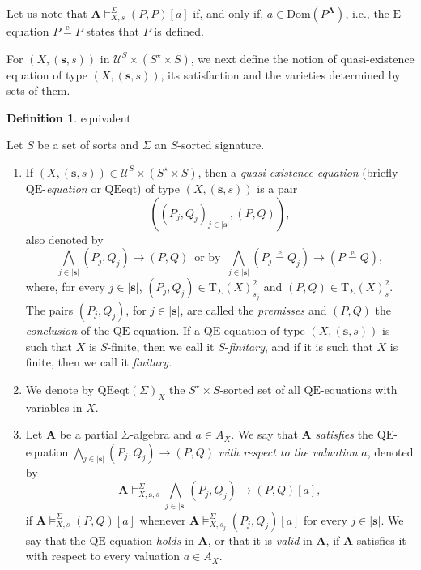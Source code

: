 \documentclass[a4paper, reqno]{amsbook}
\makeatletter
\newcommand{\bb}[1]{\ensuremath{\lvert #1 \rvert}}
\newcommand{\eeq}{\overset{\mathrm e}{=}}      %
\newcommand{\QE}{\mathrm{QE}}
\newcommand{\Dom}{\mathrm{Dom}}
\theoremstyle{plain}
\theoremstyle{definition}
\newtheorem{definition}[theorem]{Definition}
\newcommand*{\CA@leanpending}{}
\newcommand*{\CA@leanrelation}{}
\newcommand*{\lean}[2]{%
  \ifcsname\string\color@lean@#1\endcsname\else
    \PackageError{main}{Unknown relation `#1' in \string\lean}{Use equivalent, weaker or stronger.}%
  \fi
  \gdef\CA@leanrelation{#1}%
  \gdef\CA@leanpending{#2}}
\makeatother
\begin{document}
Let us note that $\mathbf{A}\models^{\Sigma}_{X,s}(P,P)[a]$ if, and only if, $a\in\Dom(P^{\mathbf{A}})$, i.e., the $\mathrm{E}$-equation $P\eeq P$ states that $P$ is defined.

For $(X,(\mathbf{s},s))$ in $\boldsymbol{\mathcal{U}}^{S}\times (S^{\star}\times S)$, we next define the notion of quasi-existence equation of type $(X,(\mathbf{s},s))$, its satisfaction and the varieties determined by sets of them.

\begin{definition}\label{DQEEq}\lean{equivalent}{QEEquation,QESpecification,IsQEVariety}
Let $S$ be a set of sorts and $\Sigma$ an $S$-sorted signature.
\begin{enumerate}
\item If $(X,(\mathbf{s},s))\in\boldsymbol{\mathcal{U}}^{S}\times (S^{\star}\times S)$, then a \emph{quasi-existence equation} (briefly $\QE$-\emph{equation} or $\mathrm{QEeqt}$) of type $(X,(\mathbf{s},s))$ is a pair
$$
\left(\left(
P_{j},Q_{j}
\right)_{j\in \bb{\mathbf{s}}},(P,Q)\right),
$$
also denoted by
$$
\textstyle
\bigwedge_{j\in\bb{\mathbf{s}}}(P_{j},Q_{j})\to (P,Q)\, \text{ or by }\,
\bigwedge_{j\in\bb{\mathbf{s}}}(P_{j}\eeq Q_{j})\to (P\eeq Q),
$$
where, for every $j\in \bb{\mathbf{s}}$, $(P_{j},Q_{j})\in\mathrm{T}_{\Sigma}(X)^{2}_{s_{j}}$ and $(P,Q)\in \mathrm{T}_{\Sigma}(X)^{2}_{s}$.
The pairs $(P_{j},Q_{j})$, for $j\in \bb{\mathbf{s}}$, are called the \emph{premisses} and $(P,Q)$ the \emph{conclusion} of the $\QE$-equation.
If a $\QE$-equation of type $(X,(\mathbf{s}, s))$ is such that $X$ is $S$-finite, then we call it $S$-\emph{finitary}, and if it is such that $X$ is finite, then we call it \emph{finitary}.
\item We denote by $\mathrm{QEeqt}(\Sigma)_{X}$ the $S^{\star}\times S$-sorted set of all $\QE$-equations with variables in $X$.
\item Let $\mathbf{A}$ be a partial $\Sigma$-algebra and $a\in A_{X}$.
We say that $\mathbf{A}$ \emph{satisfies} the $\QE$-equation $\bigwedge_{j\in\bb{\mathbf{s}}}(P_{j},Q_{j})\to (P,Q)$ \emph{with respect to the valuation} $a$, denoted by
      $$
      \textstyle
      \mathbf{A}\models^{\Sigma}_{X,\mathbf{s},s}\bigwedge_{j\in\bb{\mathbf{s}}}(P_{j},Q_{j})\to (P,Q) [a],
      $$
      if $\mathbf{A}\models^{\Sigma}_{X,s} (P,Q)[a]$ whenever $\mathbf{A}\models^{\Sigma}_{X,s_{j}} (P_{j},Q_{j})[a]$ for every $j\in \bb{\mathbf{s}}$.
We say that the $\QE$-equation \emph{holds} in $\mathbf{A}$, or that it is \emph{valid} in $\mathbf{A}$, if $\mathbf{A}$ satisfies it with respect to every valuation $a\in A_{X}$.

\end{enumerate}
\end{definition}
\end{document}
